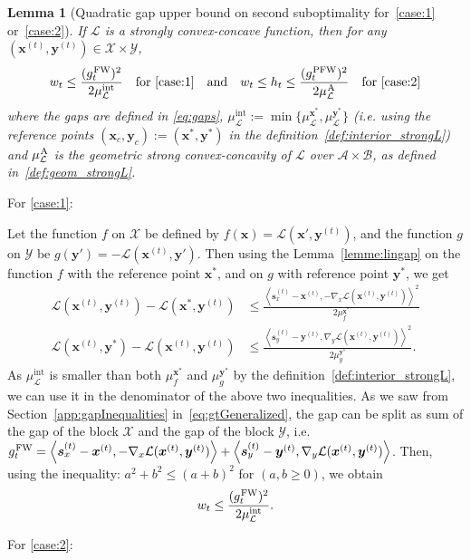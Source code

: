 \documentclass[twoside]{article}
\renewcommand{\L}{\mathcal{L}}
\newcommand{\X}{\mathcal{X}}
\newcommand{\Y}{\mathcal{Y}}
\newcommand{\M}{\X \times \Y}
\newcommand{\prodscal}[2]{\left\langle#1,#2\right\rangle}
\newcommand{\x}{\bm{x}}
\newcommand{\y}{\bm{y}}
\newcommand{\xt}{\bm{x}^{(t)}}
\newcommand{\st}{\bm{s}^{(t)}}
\newcommand{\yt}{\bm{y}^{(t)}}
\newcommand{\wt}{w_t}
\newcommand{\gap}{g_{t}}
\newtheorem{lemma}[definition]{Lemma}
\newcommand{\FW}{{\hspace{0.05em}\textnormal{FW}}}
\newcommand{\PW}{{\hspace{0.05em}\textnormal{PFW}}}
\newcommand{\away}{{\hspace{0.05em}\textnormal{A}}}
\newcommand{\Vertices}{\mathcal{A}\times \mathcal{B}} %
\newcommand{\xc}{\x_c} %
\newcommand{\yc}{\y_c} %
\newcommand{\muIntL}{\mu^{\text{int}}_\L} %
\newcommand{\0}{\mathbf{0}} %
\begin{document}
  \begin{lemma}[Quadratic gap upper bound on second suboptimality for~\eqref{case:1} or~\eqref{case:2}]\label{lemme:gap}
   If $\L$ is a strongly convex-concave function, then for any $(\xt,\yt) \in \M$,
    \begin{equation}
     \wt  \leq \frac{(\gap^{\FW})^2}{2 \muIntL } 
     \quad 
      \text{for \eqref{case:1}}
     \quad \text{and} \quad
     \wt \leq h_t \leq \frac{(\gap^{\PW})^2}{2 \mu^{\away}_\L}
     \quad
     \text{for \eqref{case:2}} %
    \end{equation}
  where the gaps are defined in \eqref{eq:gaps}, $\muIntL := \min \{ \mu^{\x^*}_\L, \mu^{\y^*}_\L\}$ (i.e. using the reference points $(\xc,\yc) := (\x^*,\y^*)$ in the definition~\eqref{def:interior_strongL})
  and $\mu^{\away}_\L$ is the geometric strong convex-concavity of $\L$ over $\Vertices$, as defined in~\eqref{def:geom_strongL}.
  \end{lemma}

  \proof For \eqref{case:1}:

   Let the function $f$ on $\X$ be defined by $f(\x) = \L(\x',\yt)$, and the function $g$ on $\Y$ be $g(\y') = -\L(\xt, \y')$. Then using the Lemma~\ref{lemme:lingap} on the function $f$ with the reference point $\x^*$, and on $g$ with reference point $\y^*$, we get
    \begin{align*}
      \L(\xt, \yt) - \L(\x^*,\yt)  & \leq  \frac{ \prodscal{\st_x - \xt }{-\nabla_x \L(\xt,\yt)}^2 }{2 \mu_f^{\x^*}}  \\
      \L(\xt, \y^*) - \L(\xt,\yt)  & \leq   \frac{ \prodscal{\st_y - \yt }{\nabla_y \L(\xt,\yt)}^2 }{2 \mu^{\y^*}_g} .
    \end{align*}
    As $\muIntL$ is smaller than both $\mu_f^{\x^*}$ and $\mu_g^{\y^*}$ by the definition~\eqref{def:interior_strongL}, we can use it in the denominator of the above two inequalities.
    As we saw from Section~\ref{app:gapInequalities} in~\eqref{eq:gtGeneralized}, the gap can be split as sum of the gap of the block $\X$ and the gap of the block $\Y$, i.e. $\gap^{\FW} =  \prodscal{\st_x- \xt}{-\nabla_x \L(\xt,\yt)} +  \prodscal{\st_y -\yt}{\nabla_y \L(\xt,\yt)} $.
    Then, using the inequality: $a^2+b^2 \leq (a+b)^2$ for $(a  ,b \geq
    0)$, we obtain
      \begin{equation} \label{eq:proof_w_FWgap}
      w_t \leq \frac{ (\gap^{\FW})^2}{2 \muIntL}.
      \end{equation}

      For \eqref{case:2}:
\end{document}

